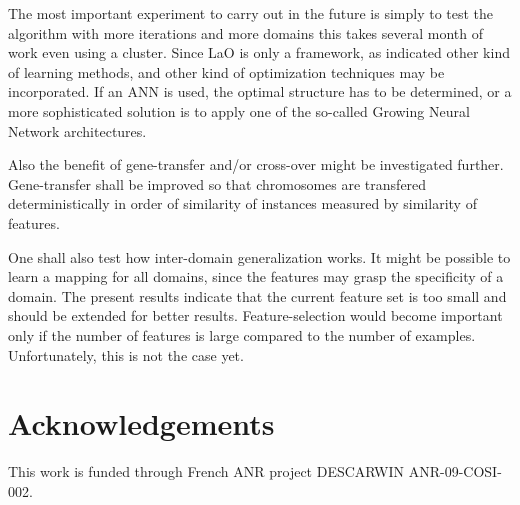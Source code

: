\documentclass{MYsig-alternate}
\begin{document}
The most important experiment to carry out in the future is simply to test the algorithm with more iterations and more domains this takes several month of work even using a cluster. Since LaO is only a framework, as indicated other kind of learning methods, and other kind of optimization techniques may be incorporated. If an ANN is used, the optimal structure has to be determined, or a more sophisticated solution is to apply one of the so-called Growing Neural Network architectures.

Also the benefit of gene-transfer and/or cross-over might be investigated further. Gene-transfer shall be improved so that chromosomes are transfered deterministically in order of similarity of instances measured by similarity of features.

One shall also test how inter-domain generalization works. It might be possible to learn a mapping for all domains, since the features may grasp the specificity of a domain. The present results indicate that the current feature set is too small and should be extended for better results. Feature-selection would become important only if the number of features is large compared to the number of examples. Unfortunately, this is not the case yet.


\section{Acknowledgements}
This work is funded through French ANR project DESCARWIN ANR-09-COSI-002.




\end{document}
